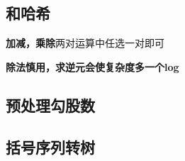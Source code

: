 \documentclass[12pt]{article}
\theoremstyle{definition}
\theoremstyle{remark}
\begin{document}


\newpage

\subsection{和哈希}

\textbf{加减，乘除}两对运算中任选一对即可

\textbf{除法慎用，求逆元会使复杂度多一个log}



\newpage

% 
% 
% 
% 

% 

\subsection{预处理勾股数}



\subsection{括号序列转树}



\newpage

% 
\end{document}
